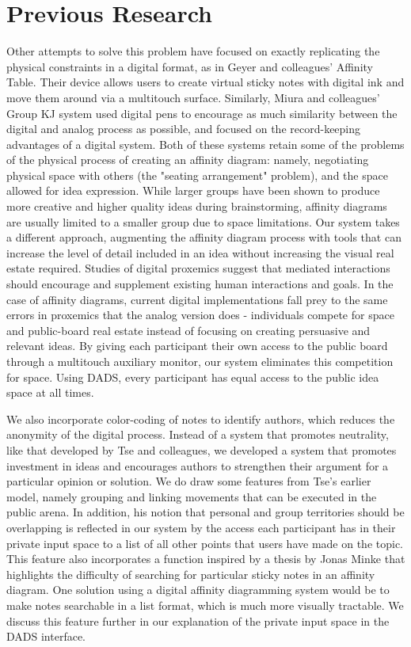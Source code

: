 \documentclass{sigchi}
\begin{document}
\section{Previous Research}
Other attempts to solve this problem have focused on exactly replicating the physical constraints in a digital format, as in Geyer and colleagues' Affinity Table\cite{Geyer:2011:DRI:2069618.2069647}. Their device allows users to create virtual sticky notes with digital ink and move them around via a multitouch surface. Similarly, Miura and colleagues' Group KJ system used digital pens to encourage as much similarity between the digital and analog process as possible, and focused on the record-keeping advantages of a digital system\cite{miura2011gkj}. Both of these systems retain some of the problems of the physical process of creating an affinity diagram: namely, negotiating physical space with others (the "seating arrangement" problem\cite{patterson1979effects}), and the space allowed for idea expression. While larger groups have been shown to produce more creative and higher quality ideas during brainstorming\cite{gallupe1994blocking}, affinity diagrams are usually limited to a smaller group due to space limitations. Our system takes a different approach, augmenting the affinity diagram process with tools that can increase the level of detail included in an idea without increasing the visual real estate required. Studies of digital proxemics\cite{ballendat2010proxemic} suggest that mediated interactions should encourage and supplement existing human interactions and goals. In the case of affinity diagrams, current digital implementations fall prey to the same errors in proxemics that the analog version does - individuals compete for space and public-board real estate instead of focusing on creating persuasive and relevant ideas. By giving each participant their own access to the public board through a multitouch auxiliary monitor, our system eliminates this competition for space. Using DADS, every participant has equal access to the public idea space at all times. 

We also incorporate color-coding of notes to identify authors, which reduces the anonymity of the digital process. Instead of a system that promotes neutrality, like that developed by Tse and colleagues\cite{Tse:2008:ETM:1394445.1394457}, we developed a system that promotes investment in ideas and  encourages authors to strengthen their argument for a particular opinion or solution. We do draw some features from Tse's earlier model, namely grouping and linking movements that can be executed in the public arena. In addition, his notion that personal and group territories should be overlapping is reflected in our system by the access each participant has in their private input space to a list of all other points that users have made on the topic. This feature also incorporates a function inspired by a thesis by Jonas Minke\cite{publication-4659} that highlights the difficulty of searching for particular sticky notes in an affinity diagram. One solution using a digital affinity diagramming system would be to make notes searchable in a list format, which is much more visually tractable. We discuss this feature further in our explanation of the private input space in the DADS interface.
\end{document}
